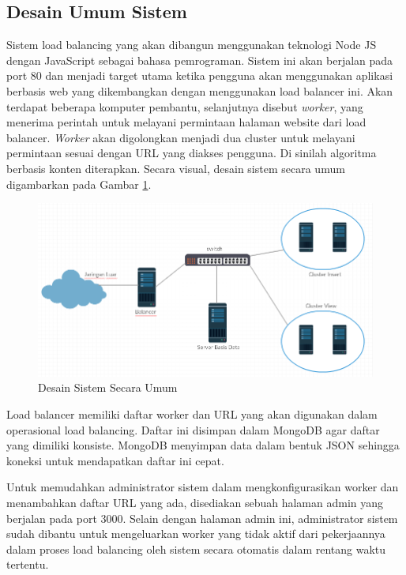 \documentclass{ta-its}
\begin{document}
		    \subsection{Desain Umum Sistem}
			    Sistem load balancing yang akan dibangun menggunakan teknologi Node JS dengan JavaScript sebagai bahasa pemrograman. Sistem ini akan berjalan pada port 80 dan menjadi target utama ketika pengguna akan menggunakan aplikasi berbasis web yang dikembangkan dengan menggunakan load balancer ini. Akan terdapat beberapa komputer pembantu, selanjutnya disebut \textit{worker}, yang menerima perintah untuk melayani permintaan halaman website dari load balancer. \textit{Worker} akan digolongkan menjadi dua cluster untuk melayani permintaan sesuai dengan URL yang diakses pengguna. Di sinilah algoritma berbasis konten diterapkan. Secara visual, desain sistem secara umum digambarkan pada Gambar \ref{gambarSistem}.
			    
			    \begin{figure}[h] %
			    	\centering
			    	\includegraphics[width=\linewidth]{contoh_img/sistem}
			    	\caption{Desain Sistem Secara Umum}
			    	\label{gambarSistem}
			    \end{figure}
			    
			    Load balancer memiliki daftar worker dan URL yang akan digunakan dalam operasional load balancing. Daftar ini disimpan dalam MongoDB agar daftar yang dimiliki konsiste. MongoDB menyimpan data dalam bentuk JSON sehingga koneksi untuk mendapatkan daftar ini cepat.
			    
			    Untuk memudahkan administrator sistem dalam mengkonfigurasikan worker dan menambahkan daftar URL yang ada, disediakan sebuah halaman admin yang berjalan pada port 3000. Selain dengan halaman admin ini, administrator sistem sudah dibantu untuk mengeluarkan worker yang tidak aktif dari pekerjaannya dalam proses load balancing oleh sistem secara otomatis dalam rentang waktu tertentu.
			    
\end{document}

